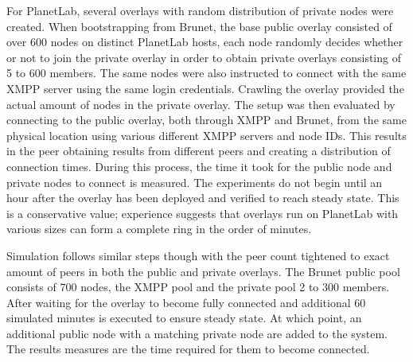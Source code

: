 \documentclass[conference]{IEEEtran}
\begin{document}
For PlanetLab, several overlays with random distribution of private nodes were
created.  When bootstrapping from Brunet, the base public overlay consisted of
over 600 nodes on distinct PlanetLab hosts, each node randomly decides whether
or not to join the private overlay in order to obtain private overlays
consisting of 5 to 600 members.  The same nodes were also instructed to connect
with the same XMPP server using the same login credentials.  Crawling the
overlay provided the actual amount of nodes in the private overlay.  The setup
was then evaluated by connecting to the public overlay, both through XMPP and
Brunet, from the same physical location using various different XMPP servers
and node IDs.  This results in the peer obtaining results from different peers
and creating a distribution of connection times.  During this process, the time
it took for the public node and private nodes to connect is measured.  The
experiments do not begin until an hour after the overlay has been deployed and
verified to reach steady state.  This is a conservative value; experience
suggests that overlays run on PlanetLab with various sizes can form a complete
ring in the order of minutes.

Simulation follows similar steps though with the peer count tightened to exact
amount of peers in both the public and private overlays.  The Brunet public
pool consists of 700 nodes, the XMPP pool and the private pool 2 to 300
members.  After waiting for the overlay to become fully connected and
additional 60 simulated minutes is executed to ensure steady state.  At which
point, an additional public node with a matching private node are added to the
system.  The results measures are the time required for them to become
connected.

\end{document}
